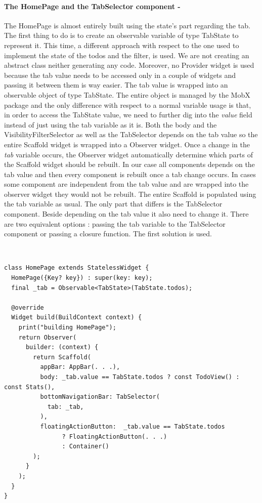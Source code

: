 \paragraph{The HomePage and the TabSelector component - }
\label{subpar:todo_app_bloc_core_state}The HomePage is almost entirely built using the state's part regarding the tab. The first thing to do is to create an observable variable of type TabState to represent it. This time, a different approach with respect to the one used to implement the state of the todos and the filter, is used. We are not creating an abstract class neither generating any code. Moreover, no Provider widget is used because the tab value needs to be accessed only in a couple of widgets and passing it between them is way easier. The tab value is wrapped into an observable object of type TabState. The entire object is managed by the MobX package and the only difference with respect to a normal variable usage is that, in order to access the TabState value, we need to further dig into the \textit{value} field instead of just using the tab variable as it is. Both the body and the VisibilityFilterSelector as well as the TabSelector depends on the tab value so the entire Scaffold widget is wrapped into a Observer widget. Once a change in the \textit{tab} variable occurs, the Observer widget automatically determine which parts of the Scaffold widget should be rebuilt. In our case all components depends on the tab value and then every component is rebuilt once a tab change occurs. In cases some component are independent from the tab value and are wrapped into the observer widget they would not be rebuilt. The entire Scaffold is populated using the tab variable as usual. The only part that differs is the TabSelector component. Beside depending on the tab value it also need to change it. There are two equivalent options : passing the tab variable to the TabSelector component or passing a closure function. The first solution is used. 
\begin{code}
\mbox{}\\
 \mbox{}
		\label{code:2.14}
\begin{verbatim}
class HomePage extends StatelessWidget {
  HomePage({Key? key}) : super(key: key);
  final _tab = Observable<TabState>(TabState.todos);

  @override
  Widget build(BuildContext context) {
    print("building HomePage");
    return Observer(
      builder: (context) {
        return Scaffold(
          appBar: AppBar(. . .),
          body: _tab.value == TabState.todos ? const TodoView() : const Stats(),
          bottomNavigationBar: TabSelector(
            tab: _tab,
          ),
          floatingActionButton:  _tab.value == TabState.todos
                ? FloatingActionButton(. . .)
                : Container()
        );
      }
    );
  }
}
\end{verbatim}
\mbox{}
\end{code}

